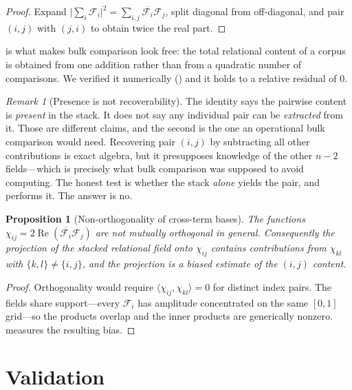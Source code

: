 \documentclass[11pt,twocolumn,a4paper]{article}
\theoremstyle{upthm}
\newtheorem{proposition}[theorem]{Proposition}
\theoremstyle{definition}
\theoremstyle{remark}
\newtheorem{remark}[theorem]{Remark}
\newcommand{\Field}{\mathcal{F}}
\newcommand{\inner}[2]{\langle#1,#2\rangle}
\begin{document}
\begin{proof}
Expand $\lvert\sum_i\Field_i\rvert^2
=\sum_{i,j}\overline{\Field_i}\Field_j$, split diagonal from
off-diagonal, and pair $(i,j)$ with $(j,i)$ to obtain twice the real
part.
\end{proof}

 is what makes bulk comparison look free: the total
relational content of a corpus is obtained from one addition rather than
from a quadratic number of comparisons. We verified it numerically
() and it holds to a relative residual of $0$.

\begin{remark}[Presence is not recoverability]
\label{rem:presence}
The identity says the pairwise content is \emph{present} in the stack. It
does not say any individual pair can be \emph{extracted} from it. Those
are different claims, and the second is the one an operational bulk
comparison would need. Recovering pair $(i,j)$ by subtracting all other
contributions is exact algebra, but it presupposes knowledge of the other
$n-2$ fields---which is precisely what bulk comparison was supposed to
avoid computing. The honest test is whether the stack \emph{alone} yields
the pair, and  performs it. The answer is no.
\end{remark}

\begin{proposition}[Non-orthogonality of cross-term bases]
\label{prop:nonorth}
The functions $\chi_{ij}=2\operatorname{Re}
(\overline{\Field_i}\Field_j)$ are not mutually orthogonal in general.
Consequently the projection of the stacked relational field onto
$\chi_{ij}$ contains contributions from $\chi_{kl}$ with
$\{k,l\}\ne\{i,j\}$, and the projection is a biased estimate of the
$(i,j)$ content.
\end{proposition}

\begin{proof}
Orthogonality would require $\inner{\chi_{ij}}{\chi_{kl}}=0$ for distinct
index pairs. The fields share support---every $\Field_i$ has amplitude
concentrated on the same $[0,1]$ grid---so the products overlap and the
inner products are generically nonzero.  measures the
resulting bias.
\end{proof}

\section{Validation}
\label{sec:validation}
\end{document}

